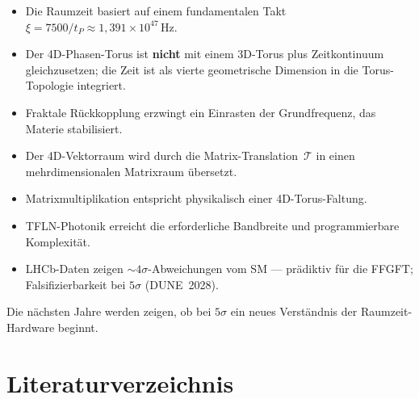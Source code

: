 \begin{itemize}
  \item Die Raumzeit basiert auf einem fundamentalen Takt
        $\xi = 7500/t_P \approx 1{,}391 \times 10^{47}\,\text{Hz}$.
  \item Der 4D-Phasen-Torus ist \textbf{nicht} mit einem 3D-Torus plus
        Zeitkontinuum gleichzusetzen; die Zeit ist als vierte geometrische
        Dimension in die Torus-Topologie integriert.
  \item Fraktale Rückkopplung erzwingt ein Einrasten der Grundfrequenz,
        das Materie stabilisiert.
  \item Der 4D-Vektorraum wird durch die Matrix-Translation~$\mathcal{T}$
        in einen mehrdimensionalen Matrixraum übersetzt.
  \item Matrixmultiplikation entspricht physikalisch einer 4D-Torus-Faltung.
  \item TFLN-Photonik erreicht die erforderliche Bandbreite und
        programmierbare Komplexität.
  \item LHCb-Daten zeigen $\sim 4\sigma$-Abweichungen vom SM — prädiktiv
        für die FFGFT; Falsifizierbarkeit bei $5\sigma$ (DUNE~2028).
\end{itemize}

\begin{keybox}
Die nächsten Jahre werden zeigen, ob bei $5\sigma$ ein neues Verständnis
der Raumzeit-Hardware beginnt.
\end{keybox}

\newpage
\section*{Literaturverzeichnis}

